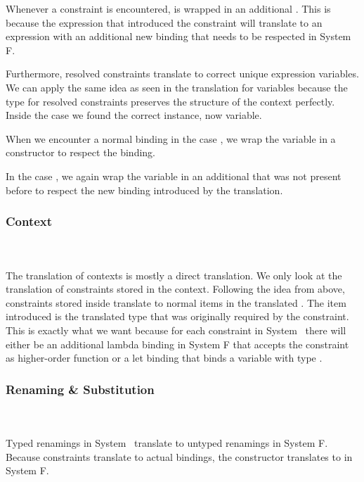 \noindent Whenever a constraint is encountered,  is wrapped in an additional . 
This is because the expression that introduced the constraint will translate to an expression with an additional new binding that needs to be respected in System F.

\noindent Furthermore, resolved constraints translate to correct unique expression variables. We can apply the same idea as seen in the translation for variables because the type for resolved constraints \Data{[}  \Data{]∈}  preserves the structure of the context perfectly. 
\DPTOVar
Inside the case  we found the correct instance, now variable.

\noindent When we encounter a normal binding in the case , we wrap the variable in a  constructor to respect the binding.

\noindent In the case , we again wrap the variable in an additional  that was not present before to respect the new binding introduced by the translation.
\subsubsection{Context}\hfill\\\\
The translation of contexts is mostly a direct translation. 
We only look at the translation of constraints stored in the context.
\DPTCtx
Following the idea from above, constraints  \Constr{:}  stored inside  translate to normal items in the translated . 
The item introduced is the translated type   that was originally required by the constraint. 
This is exactly what we want because for each constraint in System \Fo\ there will either be an additional lambda binding in System F that accepts the constraint as higher-order function or a let binding that binds a variable with type  . 


\subsubsection{Renaming \& Substitution}\hfill\\\\
Typed renamings in System \Fo\ translate to untyped renamings in System F.
\DPTRen
\noindent Because constraints translate to actual bindings, the constructor  translates to  in System F.

